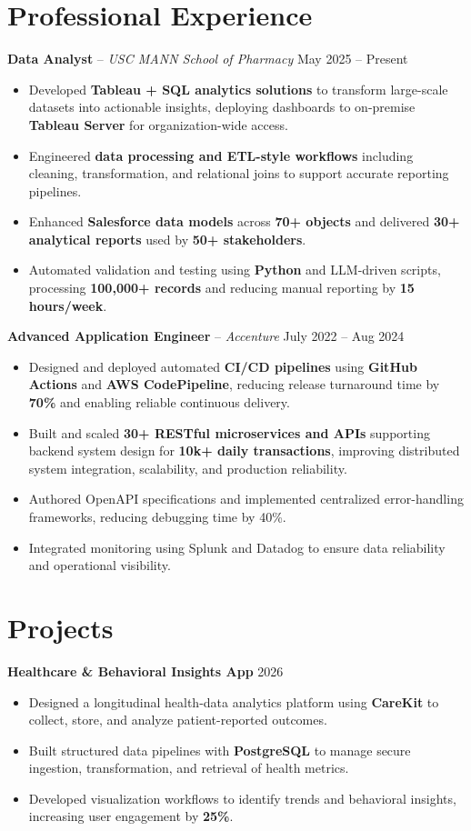 \documentclass[letterpaper,11pt]{article}
\begin{document}
\section*{Professional Experience}
\textbf{Data Analyst} -- \textit{USC MANN School of Pharmacy} \hfill May 2025 -- Present
\begin{itemize}
\item Developed \textbf{Tableau + SQL analytics solutions} to transform large-scale datasets into actionable insights, deploying dashboards to on-premise \textbf{Tableau Server} for organization-wide access.
\item Engineered \textbf{data processing and ETL-style workflows} including cleaning, transformation, and relational joins to support accurate reporting pipelines.
\item Enhanced \textbf{Salesforce data models} across \textbf{70+ objects} and delivered \textbf{30+ analytical reports} used by \textbf{50+ stakeholders}.
\item Automated validation and testing using \textbf{Python} and LLM-driven scripts, processing \textbf{100,000+ records} and reducing manual reporting by \textbf{15 hours/week}.
\end{itemize}

\textbf{Advanced Application Engineer} -- \textit{Accenture} \hfill July 2022 -- Aug 2024
\begin{itemize}
\item Designed and deployed automated \textbf{CI/CD pipelines} using \textbf{GitHub Actions} and \textbf{AWS CodePipeline}, reducing release turnaround time by \textbf{70\%} and enabling reliable continuous delivery.
\item Built and scaled \textbf{30+ RESTful microservices and APIs} supporting backend system design for \textbf{10k+ daily transactions}, improving distributed system integration, scalability, and production reliability.
\item Authored OpenAPI specifications and implemented centralized error-handling frameworks, reducing debugging time by 40\%.
\item Integrated monitoring using Splunk and Datadog to ensure data reliability and operational visibility.
\end{itemize}


\section*{Projects}
\textbf{Healthcare \& Behavioral Insights App} \hfill 2026
\begin{itemize}
\item Designed a longitudinal health-data analytics platform using \textbf{CareKit} to collect, store, and analyze patient-reported outcomes.
\item Built structured data pipelines with \textbf{PostgreSQL} to manage secure ingestion, transformation, and retrieval of health metrics.
\item Developed visualization workflows to identify trends and behavioral insights, increasing user engagement by \textbf{25\%}.
\end{itemize}
\end{document}
